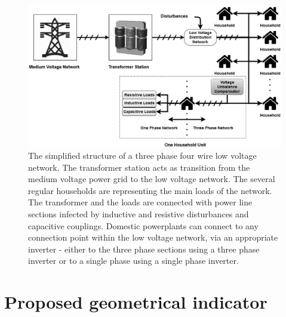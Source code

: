         \begin{figure}[!ht]
            \centering
            \includegraphics[width=\textwidth]{Unblance_EPS_Pics/network_gray.eps}
            \caption{The simplified structure of a three phase four wire low voltage network. The transformer station acts as transition from the medium voltage power grid to
            the low voltage network. The several regular households are representing the main loads of the network. The transformer and the loads are connected with power line sections infected by inductive and resistive disturbances and capacitive couplings. Domestic powerplants can connect to any connection point within the low voltage network, via an appropriate inverter - either to the three phase sections using a three phase inverter or to a single phase using a single phase inverter.}
            \label{fig:network}
            \end{figure}
        
\section{Proposed geometrical indicator}\label{VUB:sec:Geom}

